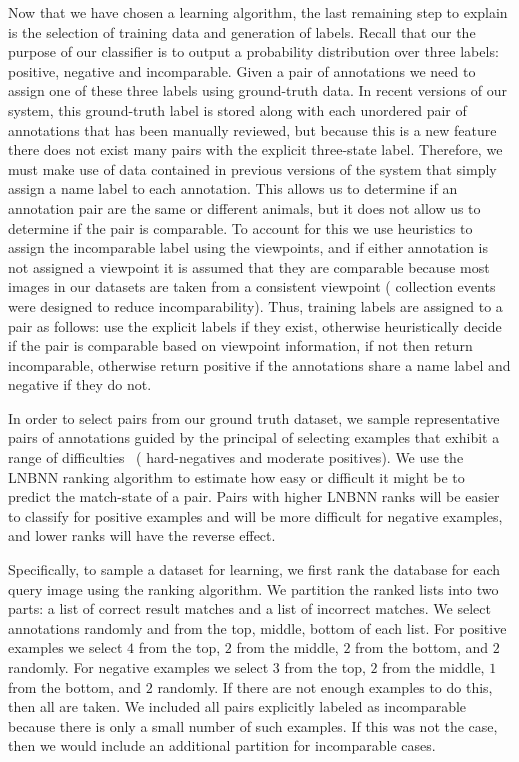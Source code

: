     Now that we have chosen a learning algorithm, the last remaining step to explain is the selection of training
      data and generation of labels.
    Recall that our the purpose of our classifier is to output a probability distribution over three labels:
    positive, negative and incomparable.
    Given a pair of annotations we need to assign one of these three labels using ground-truth data.
    In recent versions of our system, this ground-truth label is stored along with each unordered pair of
      annotations that has been manually reviewed, but because this is a new feature there does not exist many
      pairs with the explicit three-state label.
    Therefore, we must make use of data contained in previous versions of the system that simply assign a name
      label to each annotation.
    This allows us to determine if an annotation pair are the same or different animals, but it does not allow us
      to determine if the pair is comparable.
    To account for this we use heuristics to assign the incomparable label using the viewpoints, and if either
      annotation is not assigned a viewpoint it is assumed that they are comparable because most images in our
      datasets are taken from a consistent viewpoint (\ie{} collection events were designed to reduce
      incomparability).
    Thus, training labels are assigned to a pair as follows:
    use the explicit labels if they exist, otherwise heuristically decide if the pair is comparable based on
      viewpoint information, if not then return incomparable, otherwise return positive if the annotations share a
      name label and negative if they do not.

    In order to select pairs from our ground truth dataset, we sample representative pairs of annotations guided
      by the principal of selecting examples that exhibit a range of difficulties~\cite{shi_embedding_2016} (\eg
      hard-negatives and moderate positives).
    We use the LNBNN ranking algorithm to estimate how easy or difficult it might be to predict the match-state
      of a pair.
    Pairs with higher LNBNN ranks will be easier to classify for positive examples and will be more difficult for
      negative examples, and lower ranks will have the reverse effect.

    Specifically, to sample a dataset for learning, we first rank the database for each query image using the
      ranking algorithm.
    We partition the ranked lists into two parts:
    a list of correct result matches and a list of incorrect matches.
    We select annotations randomly and from the top, middle, bottom of each list.
    For positive examples we select $4$ from the top, $2$ from the middle, $2$ from the bottom, and $2$ randomly.
    For negative examples we select $3$ from the top, $2$ from the middle, $1$ from the bottom, and $2$ randomly.
    If there are not enough examples to do this, then all are taken.
    We included all pairs explicitly labeled as incomparable because there is only a small number of such
      examples.
    If this was not the case, then we would include an additional partition for incomparable cases.



